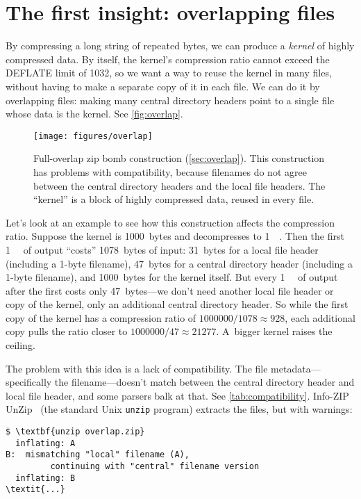 \documentclass[letterpaper,twocolumn,10pt]{article}
\newcommand{\MB}{\mega\byte}
\begin{document}
\section{The first insight: overlapping files}
\label{sec:overlap}

By compressing a long string of repeated bytes,
we can produce a \emph{kernel}
of highly compressed data.
By itself, the kernel's compression ratio cannot
exceed the DEFLATE limit of \num{1032},
so we want a way to reuse the kernel in many files,
without having to make a separate copy of it in each file.
We can do it by overlapping files:
making many central directory headers point to
a single file whose data is the kernel.
See \autoref{fig:overlap}.

\begin{figure*}
\texttt{[image: figures/overlap]}
\caption{
Full-overlap zip bomb construction
(\autoref{sec:overlap}).
This construction has problems with compatibility,
because filenames do not agree between the
central directory headers and the local file headers.
The ``kernel'' is a block of highly compressed data,
reused in every file.
}
\label{fig:overlap}
\end{figure*}

Let's look at an example to see how this construction affects the compression ratio.
Suppose the kernel is \SI{1000}{bytes} and
decompresses to \SI{1}{\MB}.
Then the first \SI{1}{\MB} of output ``costs''
\SI{1078}{bytes} of input:
\SI{31}{bytes} for a local file header (including a 1-byte filename),
\SI{47}{bytes} for a central directory header (including a 1-byte filename), and
\SI{1000}{bytes} for the kernel itself.
But every \SI{1}{\MB} of output
after the first costs only \SI{47}{bytes}---we don't need another local file header or copy of the kernel,
only an additional central directory header.
So while the first copy of the kernel has a compression ratio of
$\num{1000000}/\num{1078}\approx \num{928}$,
each additional copy pulls the ratio closer to
$\num{1000000}/\num{47}\approx \num{21277}$.
A~bigger kernel raises the ceiling.

The problem with this idea is a lack of compatibility.
The file metadata---specifically the filename---doesn't match
between the central directory header and local file header,
and some parsers balk at that.
See \autoref{tab:compatibility}.
Info-ZIP UnZip~\cite{infozip-unzip}
(the standard Unix \texttt{unzip} program)
extracts the files, but with warnings:

{\small
\begin{Verbatim}[commandchars=\\\{\}]
$ \textbf{unzip overlap.zip}
  inflating: A
B:  mismatching "local" filename (A),
         continuing with "central" filename version
  inflating: B
\textit{...}
\end{Verbatim}
}
\end{document}
